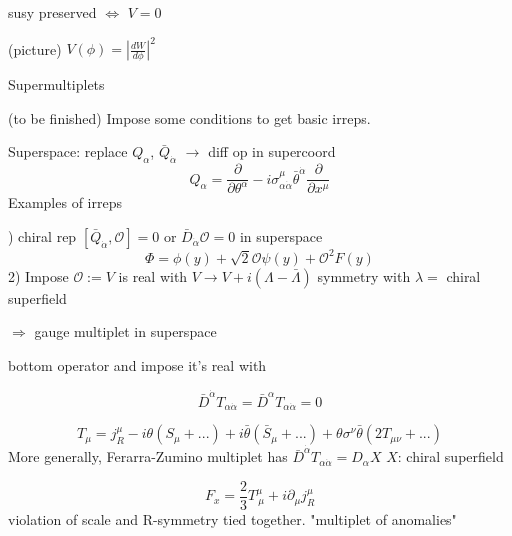 \documentclass[type = bachelor]{fduthesis-en}
\begin{document}
susy preserved $\Longleftrightarrow$ $V=0$ 

(picture) $V(\phi)=\left|\frac{dW}{d\phi}\right|^2$

\bigskip
Supermultiplets

(to be finished) Impose some conditions to get basic irreps.

Superspace: replace $Q_{\alpha}$, $\bar{Q}_{\dot{\alpha}}$ $\rightarrow$ diff op in supercoord
\begin{equation}
Q_{\alpha}=\frac{\partial}{\partial\theta^{\alpha}}-i\sigma^{\mu}_{\alpha\dot{\alpha}}\bar{\theta}^{\dot{\alpha}}\frac{\partial}{\partial x^{\mu}}
\end{equation}
\bigskip
Examples of irreps

) chiral rep $[\bar{Q}_{\dot{\alpha}}, \mathcal{O}]=0$ or $\bar{D}_{\dot{\alpha}}\mathcal{O}=0$ in superspace
\begin{equation}
\Phi = \phi(y)+\sqrt{2}\mathcal{O}\psi(y)+\mathcal{O}^2F(y)
\end{equation}
2) Impose $\mathcal{O}:=V$ is real with $V \rightarrow V+i(\Lambda-\bar{\Lambda})$ symmetry with $\lambda = $ chiral superfield

$\Rightarrow$ gauge multiplet in superspace

bottom operator and impose it's real with

\begin{equation}
\label{FZmultiplet}
\bar{D}^{\dot{\alpha}}T_{\alpha\dot{\alpha}}=\bar{D}^{\alpha}T_{\alpha\dot{\alpha}}=0
\end{equation}

\begin{equation}
T_{\mu}=j^{\mu}_R-i\theta(S_{\mu}+...)+i\bar{\theta}(\bar{S}_{\mu}+...)+\theta\sigma^{\nu}\bar{\theta}(2T_{\mu\nu}+...)
\end{equation}
More generally, Ferarra-Zumino multiplet has $\bar{D}^{\dot{\alpha}}T_{\alpha\dot{\alpha}}=D_{\alpha}X$ $X$: chiral superfield

\begin{equation}
F_x=\frac{2}{3}T^{\mu}_{ \ \mu}+i\partial_{\mu}j^{\mu}_R
\end{equation}
violation of scale and R-symmetry tied together. "multiplet of anomalies"
\end{document}
